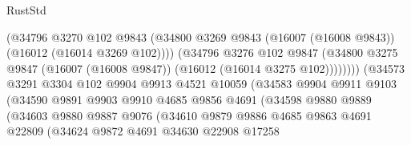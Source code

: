 \begin{lexlean}{RustStd}
\begin{coremodule}
                                      (@34796
                                        @3270
                                        @102
                                        @9843
                                        (@34800
                                          @3269
                                          @9843
                                          (@16007 (@16008 @9843))
                                          (@16012 (@16014 @3269 @102))))
                                      (@34796
                                        @3276
                                        @102
                                        @9847
                                        (@34800
                                          @3275
                                          @9847
                                          (@16007 (@16008 @9847))
                                          (@16012 (@16014 @3275 @102))))))))
                              (@34573
                                @3291
                                @3304
                                @102
                                @9904
                                @9913
                                @4521
                                @10059
                                (@34583
                                  @9904
                                  @9911
                                  @9103
                                  (@34590
                                    @9891
                                    @9903
                                    @9910
                                    @4685
                                    @9856
                                    @4691
                                    (@34598
                                      @9880
                                      @9889
                                      (@34603
                                        @9880
                                        @9887
                                        @9076
                                        (@34610
                                          @9879
                                          @9886
                                          @4685
                                          @9863
                                          @4691
                                          @22809
                                          (@34624
                                            @9872
                                            @4691
                                            @34630
                                            @22908
                                            @17258

\end{coremodule}
\end{lexlean}
